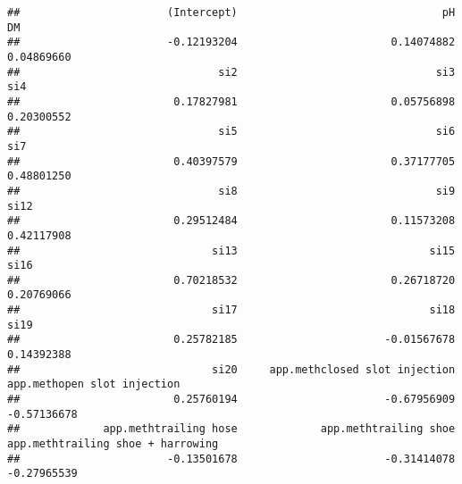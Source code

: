 \documentclass[
]{article}
\begin{document}
\begin{verbatim}
##                       (Intercept)                                pH                                DM 
##                       -0.12193204                        0.14074882                        0.04869660 
##                               si2                               si3                               si4 
##                        0.17827981                        0.05756898                        0.20300552 
##                               si5                               si6                               si7 
##                        0.40397579                        0.37177705                        0.48801250 
##                               si8                               si9                              si12 
##                        0.29512484                        0.11573208                        0.42117908 
##                              si13                              si15                              si16 
##                        0.70218532                        0.26718720                        0.20769066 
##                              si17                              si18                              si19 
##                        0.25782185                       -0.01567678                        0.14392388 
##                              si20     app.methclosed slot injection       app.methopen slot injection 
##                        0.25760194                       -0.67956909                       -0.57136678 
##             app.methtrailing hose             app.methtrailing shoe app.methtrailing shoe + harrowing 
##                       -0.13501678                       -0.31414078                       -0.27965539
\end{verbatim}
\end{document}
